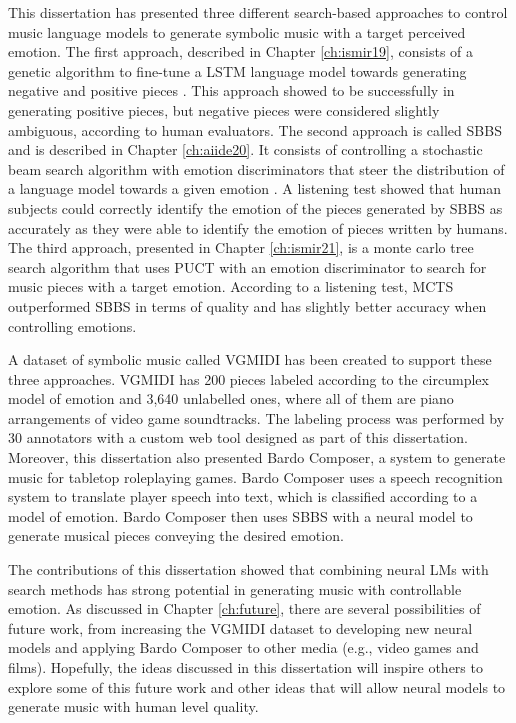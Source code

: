 This dissertation has presented three different search-based approaches to control music language models to generate symbolic music with a target perceived emotion. The first approach, described in Chapter \ref{ch:ismir19}, consists of a genetic algorithm to fine-tune a LSTM language model towards generating negative and positive pieces \cite{ferreira_2019}. This approach showed to be successfully in generating positive pieces, but negative pieces were considered slightly ambiguous, according to human evaluators. The second approach is called SBBS and is described in Chapter \ref{ch:aiide20}. It consists of controlling a stochastic beam search algorithm with emotion discriminators that steer the distribution of a language model towards a given emotion \cite{ferreira2020computer}.
A listening test showed that human subjects could correctly identify the emotion of the pieces generated by SBBS as accurately as they were able to identify the emotion of pieces written by humans. The third approach, presented in Chapter \ref{ch:ismir21}, is a monte carlo tree search algorithm that uses PUCT with an emotion discriminator to search for music pieces with a target emotion. According to a listening test, MCTS outperformed SBBS in terms of quality and has slightly better accuracy when controlling emotions.

A dataset of symbolic music called VGMIDI has been created to support these three approaches. VGMIDI has 200  pieces labeled according to the circumplex model of emotion \cite{russell1980circumplex} and 3,640 unlabelled ones, where all of them are piano arrangements of video game soundtracks. The labeling process was performed by 30 annotators with a custom web tool designed as part of this dissertation. Moreover, this dissertation also presented Bardo Composer, a system to generate music for tabletop roleplaying games. Bardo Composer uses a speech recognition system to translate player speech into text, which is classified according to a model of emotion. Bardo Composer then uses SBBS with a neural model to generate musical pieces conveying the desired emotion.

The contributions of this dissertation showed that combining neural LMs with search methods has strong potential in generating music with controllable emotion. As discussed in Chapter \ref{ch:future}, there are several possibilities of future work, from increasing the VGMIDI dataset to developing new neural models and applying Bardo Composer to other media (e.g., video games and films). Hopefully, the ideas discussed in this dissertation will inspire others to explore some of this future work and other ideas that will allow neural models to generate music with human level quality.
